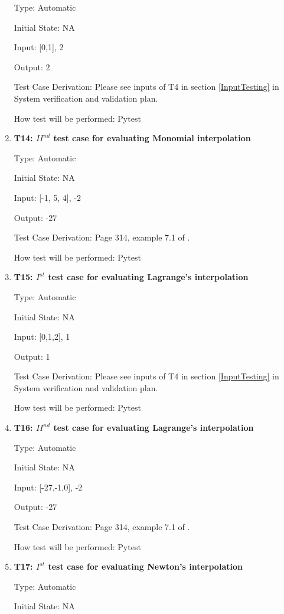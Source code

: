 \documentclass[12pt, titlepage]{article}
\begin{document}
\begin{enumerate}
Type: Automatic

Initial State: NA 

Input: [0,1], 2 

Output: 2

Test Case Derivation: Please see inputs of T4 in section \ref{InputTesting} in 
System verification and validation plan. 

How test will be performed: Pytest



\item{\textbf{T14: ${II}^{nd}$ test case for evaluating Monomial interpolation}}

Type: Automatic

Initial State: NA 

Input: [-1, 5, 4], -2 

Output: -27

Test Case Derivation: Page 314, example 7.1 of \cite{Health1997}. 

How test will be performed: Pytest



\item{\textbf{T15: $I^{st}$ test case for evaluating Lagrange's interpolation}}

Type: Automatic

Initial State: NA 

Input: [0,1,2], 1 

Output: 1

Test Case Derivation: Please see inputs of T4 in section \ref{InputTesting} in 
System verification and validation plan.

How test will be performed: Pytest

\item{\textbf{T16: ${II}^{nd}$ test case for evaluating Lagrange's 
interpolation}}

Type: Automatic

Initial State: NA 

Input: [-27,-1,0], -2 

Output: -27

Test Case Derivation: Page 314, example 7.1 of \cite{Health1997}. 

How test will be performed: Pytest

\item{\textbf{T17: $I^{st}$ test case for evaluating Newton's interpolation}}

Type: Automatic

Initial State: NA 


\end{enumerate}
\end{document}
